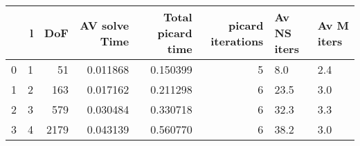 \begin{tabular}{lrrrrrll}
\toprule
{} &  l &   DoF &  AV solve Time &  Total picard time &  picard iterations & Av NS iters & Av M iters \\
\midrule
0 &  1 &    51 &       0.011868 &           0.150399 &                  5 &         8.0 &        2.4 \\
1 &  2 &   163 &       0.017162 &           0.211298 &                  6 &        23.5 &        3.0 \\
2 &  3 &   579 &       0.030484 &           0.330718 &                  6 &        32.3 &        3.3 \\
3 &  4 &  2179 &       0.043139 &           0.560770 &                  6 &        38.2 &        3.0 \\
\bottomrule
\end{tabular}
